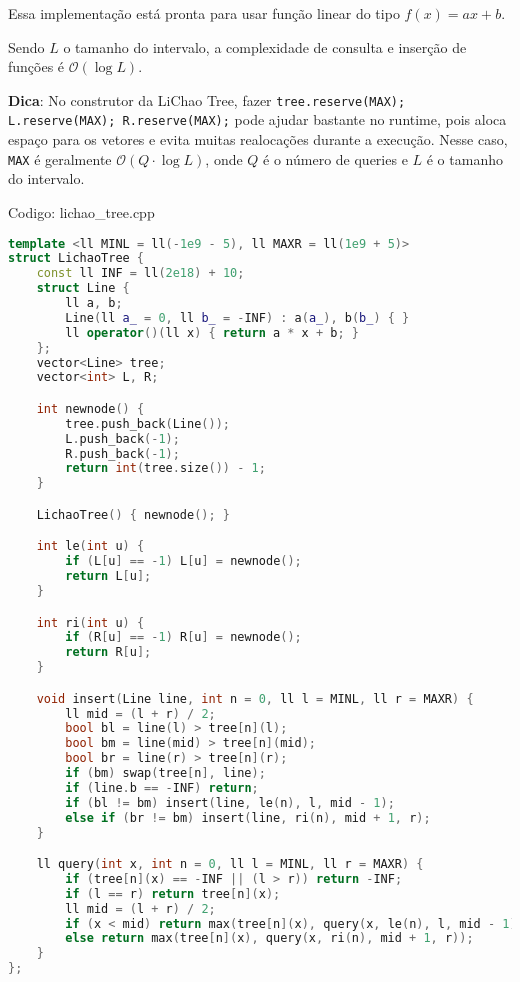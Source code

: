\documentclass[10pt, a4paper, oneside]{book}
\begin{document}
Essa implementação está pronta para usar função linear do tipo $f(x) = ax + b$.



Sendo $L$ o tamanho do intervalo, a complexidade de consulta e inserção de funções é $\mathcal{O}(\log L)$.



\textbf{Dica}: No construtor da LiChao Tree, fazer \texttt{tree.reserve(MAX); L.reserve(MAX); R.reserve(MAX);} pode ajudar bastante no runtime, pois aloca espaço para os vetores e evita muitas realocações durante a execução. Nesse caso, \texttt{MAX} é geralmente $\mathcal{O}(Q \cdot \log L)$, onde $Q$ é o número de queries e $L$ é o tamanho do intervalo.
\hfill

Codigo: lichao\_tree.cpp

\begin{lstlisting}[language=C++]
template <ll MINL = ll(-1e9 - 5), ll MAXR = ll(1e9 + 5)>
struct LichaoTree {
    const ll INF = ll(2e18) + 10;
    struct Line {
        ll a, b;
        Line(ll a_ = 0, ll b_ = -INF) : a(a_), b(b_) { }
        ll operator()(ll x) { return a * x + b; }
    };
    vector<Line> tree;
    vector<int> L, R;

    int newnode() {
        tree.push_back(Line());
        L.push_back(-1);
        R.push_back(-1);
        return int(tree.size()) - 1;
    }

    LichaoTree() { newnode(); }

    int le(int u) {
        if (L[u] == -1) L[u] = newnode();
        return L[u];
    }

    int ri(int u) {
        if (R[u] == -1) R[u] = newnode();
        return R[u];
    }

    void insert(Line line, int n = 0, ll l = MINL, ll r = MAXR) {
        ll mid = (l + r) / 2;
        bool bl = line(l) > tree[n](l);
        bool bm = line(mid) > tree[n](mid);
        bool br = line(r) > tree[n](r);
        if (bm) swap(tree[n], line);
        if (line.b == -INF) return;
        if (bl != bm) insert(line, le(n), l, mid - 1);
        else if (br != bm) insert(line, ri(n), mid + 1, r);
    }

    ll query(int x, int n = 0, ll l = MINL, ll r = MAXR) {
        if (tree[n](x) == -INF || (l > r)) return -INF;
        if (l == r) return tree[n](x);
        ll mid = (l + r) / 2;
        if (x < mid) return max(tree[n](x), query(x, le(n), l, mid - 1));
        else return max(tree[n](x), query(x, ri(n), mid + 1, r));
    }
};
\end{lstlisting}
\hfill
\end{document}
